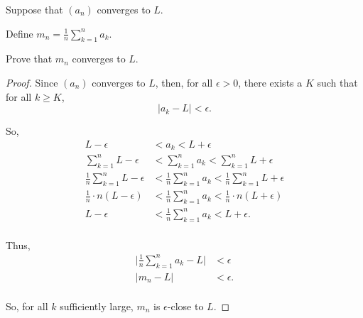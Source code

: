 \documentclass[../root file]{subfiles}
\begin{document}
Suppose that $(a_n)$ converges to $L$.

Define $m_n=\frac{1}{n} \sum_{k=1}^{n}a_k$.

Prove that $m_n$ converges to $L$.

\begin{proof}
    
Since $(a_n)$ converges to $L$, then, for all $\epsilon>0$, there exists a $K$ such that for all $k \geq K$, \[|a_k-L|<\epsilon.\]

So, 
\begin{align*}
    L-\epsilon &< a_k < L+\epsilon \\
    \sum_{k=1}^{n} L-\epsilon &< \sum_{k=1}^{n} a_k < \sum_{k=1}^{n}L+\epsilon \\
    \frac{1}{n}\sum_{k=1}^{n} L-\epsilon &< \frac{1}{n}\sum_{k=1}^{n} a_k < \frac{1}{n}\sum_{k=1}^{n}L+\epsilon \\
    \frac{1}{n}\cdot n(L-\epsilon) &< \frac{1}{n}\sum_{k=1}^{n} a_k < \frac{1}{n}\cdot n(L+\epsilon) \\
    L-\epsilon &< \frac{1}{n}\sum_{k=1}^{n} a_k < L+\epsilon. \\
\end{align*}

Thus,
\begin{align*}
    \Bigg|\frac{1}{n}\sum_{k=1}^{n} a_k - L\Bigg| &< \epsilon \\
    |m_n-L|&<\epsilon. \\
\end{align*}

So, for all $k$ sufficiently large, $m_n$ is $\epsilon$-close to $L$.

\end{proof}
\end{document}
